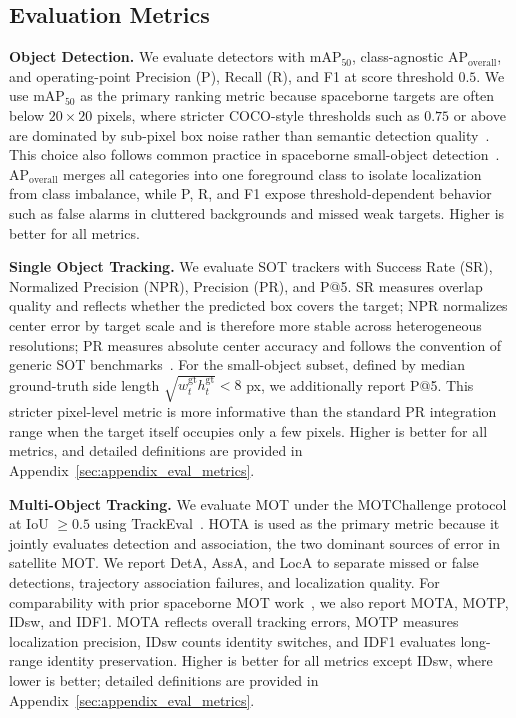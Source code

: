 \documentclass{article}
\newcommand{\subhead}[1]{\noindent\textbf{#1.}}
\begin{document}
\subsection{Evaluation Metrics}
\subhead{Object Detection} We evaluate detectors with $\mathrm{mAP}_{50}$, class-agnostic $\mathrm{AP}_{\text{overall}}$, and operating-point Precision (P), Recall (R), and F1 at score threshold $0.5$. We use $\mathrm{mAP}_{50}$ as the primary ranking metric because spaceborne targets are often below $20\times20$ pixels, where stricter COCO-style thresholds such as $0.75$ or above are dominated by sub-pixel box noise rather than semantic detection quality~\citep{lin2014coco}. This choice also follows common practice in spaceborne small-object detection~\citep{Li2023SATMTB,He2022TGraM}. $\mathrm{AP}_{\text{overall}}$ merges all categories into one foreground class to isolate localization from class imbalance, while P, R, and F1 expose threshold-dependent behavior such as false alarms in cluttered backgrounds and missed weak targets. Higher is better for all metrics.

\subhead{Single Object Tracking} We evaluate SOT trackers with Success Rate (SR), Normalized Precision (NPR), Precision (PR), and P@5. SR measures overlap quality and reflects whether the predicted box covers the target; NPR normalizes center error by target scale and is therefore more stable across heterogeneous resolutions; PR measures absolute center accuracy and follows the convention of generic SOT benchmarks~\citep{muller2018trackingnet,fan2019lasot,huang2021got10k}. For the small-object subset, defined by median ground-truth side length $\sqrt{w_t^{\mathrm{gt}} h_t^{\mathrm{gt}}}<8$ px, we additionally report P@5. This stricter pixel-level metric is more informative than the standard PR integration range when the target itself occupies only a few pixels. Higher is better for all metrics, and detailed definitions are provided in Appendix~\ref{sec:appendix_eval_metrics}.

\subhead{Multi-Object Tracking} We evaluate MOT under the MOTChallenge protocol at IoU $\geq0.5$ using TrackEval~\citep{luiten2021hota,bernardin2008clear,ristani2016idf1}. HOTA is used as the primary metric because it jointly evaluates detection and association, the two dominant sources of error in satellite MOT. We report DetA, AssA, and LocA to separate missed or false detections, trajectory association failures, and localization quality. For comparability with prior spaceborne MOT work~\citep{Li2023SATMTB,He2022TGraM}, we also report MOTA, MOTP, IDsw, and IDF1. MOTA reflects overall tracking errors, MOTP measures localization precision, IDsw counts identity switches, and IDF1 evaluates long-range identity preservation. Higher is better for all metrics except IDsw, where lower is better; detailed definitions are provided in Appendix~\ref{sec:appendix_eval_metrics}.
\end{document}
